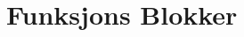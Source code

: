 \thispagestyle{fancy}

\newcommand{\leftalignedsection}[1]{%
  \titleformat{\section}[hang]{\raggedright\normalfont\Large\bfseries}{\thesection.}{1em}{}%
  \section{#1}%
}





\chapter{Funksjons Blokker}
\thispagestyle{fancy}

